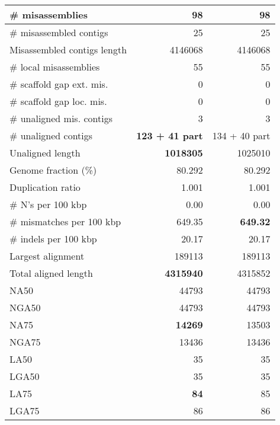 \documentclass[12pt,a4paper]{article}
\begin{document}
\begin{table}[ht]
\begin{center}
\begin{tabular}{|l*{2}{|r}|}
\# misassemblies & 98 & 98 \\ \hline
\# misassembled contigs & 25 & 25 \\ \hline
Misassembled contigs length & 4146068 & 4146068 \\ \hline
\# local misassemblies & 55 & 55 \\ \hline
\# scaffold gap ext. mis. & 0 & 0 \\ \hline
\# scaffold gap loc. mis. & 0 & 0 \\ \hline
\# unaligned mis. contigs & 3 & 3 \\ \hline
\# unaligned contigs & {\bf 123 + 41 part} & 134 + 40 part \\ \hline
Unaligned length & {\bf 1018305} & 1025010 \\ \hline
Genome fraction (\%) & 80.292 & 80.292 \\ \hline
Duplication ratio & 1.001 & 1.001 \\ \hline
\# N's per 100 kbp & 0.00 & 0.00 \\ \hline
\# mismatches per 100 kbp & 649.35 & {\bf 649.32} \\ \hline
\# indels per 100 kbp & 20.17 & 20.17 \\ \hline
Largest alignment & 189113 & 189113 \\ \hline
Total aligned length & {\bf 4315940} & 4315852 \\ \hline
NA50 & 44793 & 44793 \\ \hline
NGA50 & 44793 & 44793 \\ \hline
NA75 & {\bf 14269} & 13503 \\ \hline
NGA75 & 13436 & 13436 \\ \hline
LA50 & 35 & 35 \\ \hline
LGA50 & 35 & 35 \\ \hline
LA75 & {\bf 84} & 85 \\ \hline
LGA75 & 86 & 86 \\ \hline
\end{tabular}
\end{center}
\end{table}
\end{document}
